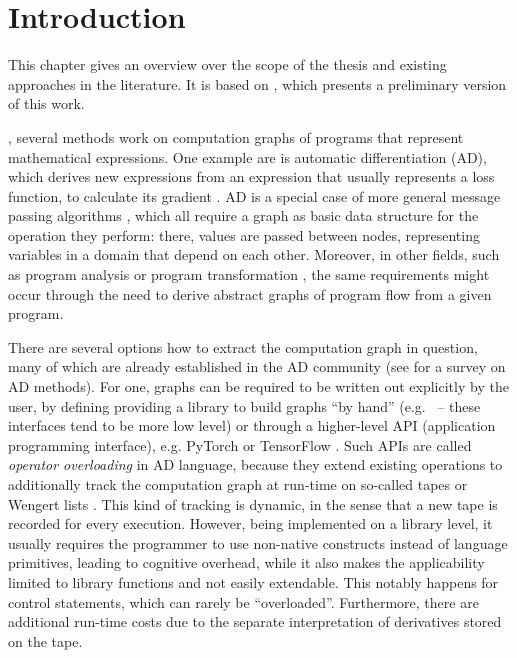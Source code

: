 \chapter{Introduction}
\label{cha:introduction}

This chapter gives an overview over the scope of the thesis and existing approaches in the
literature.  It is based on \textcite{gabler2019graph}, which presents a preliminary version of this
work.

, several methods work on computation graphs of programs that
represent mathematical expressions.  One example are is automatic differentiation (AD), which
derives new expressions from an expression that usually represents a loss function, to calculate its
gradient \parencite{griewank2008evaluating, gebremedhin2020introduction}.  AD is a special case of
more general message passing algorithms
\parencite{minka2005divergence,ruozzi2011message,minka2019automatic}, which all require a graph as
basic data structure for the operation they perform: there, values are passed between nodes,
representing variables in a domain that depend on each other.  Moreover, in other fields, such as
program analysis or program transformation
\parencite[cf.][]{muchnick1997advanced,singer2018static,aho1986compilers}, the same requirements
might occur through the need to derive abstract graphs of program flow from a given program.

There are several options how to extract the computation graph in question, many of which are
already established in the AD community (see \textcite{baydin2018automatic} for a survey on AD
methods).  For one, graphs can be required to be written out explicitly by the user, by defining
providing a library to build graphs \enquote{by hand}
(e.g. \textcite{chewxy2020gorgonia,jia2014caffe}~-- these interfaces tend to be more low level) or
through a higher-level API (application programming interface), e.g. PyTorch
\parencite{paszke2017automatic} or TensorFlow \parencite{abadi2015tensorflow}.  Such APIs are called
\emph{operator overloading} in AD language, because they extend existing operations to additionally
track the computation graph at run-time on so-called tapes or Wengert lists
\parencite{bartholomew-biggs2000automatic}.  This kind of tracking is dynamic, in the sense that a
new tape is recorded for every execution.  However, being implemented on a library level, it usually
requires the programmer to use non-native constructs instead of language primitives, leading to
cognitive overhead, while it also makes the applicability limited to library functions and not
easily extendable.  This notably happens for control statements, which can rarely be
\enquote{overloaded}.  Furthermore, there are additional run-time costs due to the separate
interpretation of derivatives stored on the tape.

